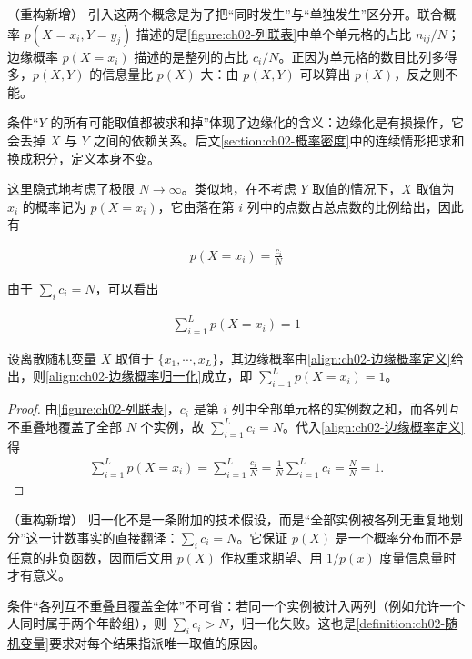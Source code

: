 \documentclass[../../main.tex]{subfiles}
\begin{document}
\begin{remark}（重构新增）
引入这两个概念是为了把“同时发生”与“单独发生”区分开。联合概率 $p(X=x_i,Y=y_j)$ 描述的是\cref{figure:ch02-列联表}中单个单元格的占比 $n_{ij}/N$；边缘概率 $p(X=x_i)$ 描述的是整列的占比 $c_i/N$。正因为单元格的数目比列多得多，$p(X,Y)$ 的信息量比 $p(X)$ 大：由 $p(X,Y)$ 可以算出 $p(X)$，反之则不能。

条件“$Y$ 的所有可能取值都被求和掉”体现了边缘化的含义：边缘化是有损操作，它会丢掉 $X$ 与 $Y$ 之间的依赖关系。后文\cref{section:ch02-概率密度}中的连续情形把求和换成积分，定义本身不变。
\end{remark}

这里隐式地考虑了极限 $N\to\infty$。类似地，在不考虑 $Y$ 取值的情况下，$X$ 取值为 $x_i$ 的概率记为 $p(X=x_i)$，它由落在第 $i$ 列中的点数占总点数的比例给出，因此有

\begin{align}
  p(X=x_i) = \frac{c_i}{N}
  \label{align:ch02-边缘概率定义}
\end{align}

由于 $\sum_i c_i = N$，可以看出

\begin{align}
  \sum_{i=1}^{L} p(X=x_i) = 1
  \label{align:ch02-边缘概率归一化}
\end{align}

\begin{proposition}[边缘概率的归一化]\label{proposition:ch02-边缘概率归一化}
设离散随机变量 $X$ 取值于 $\{x_1,\cdots,x_L\}$，其边缘概率由\eqref{align:ch02-边缘概率定义}给出，则\eqref{align:ch02-边缘概率归一化}成立，即 $\sum_{i=1}^{L}p(X=x_i)=1$。
\end{proposition}

\begin{proof}
由\cref{figure:ch02-列联表}，$c_i$ 是第 $i$ 列中全部单元格的实例数之和，而各列互不重叠地覆盖了全部 $N$ 个实例，故 $\sum_{i=1}^{L}c_i=N$。代入\eqref{align:ch02-边缘概率定义}得
\begin{align*}
  \sum_{i=1}^{L} p(X=x_i) = \sum_{i=1}^{L}\frac{c_i}{N} = \frac{1}{N}\sum_{i=1}^{L}c_i = \frac{N}{N} = 1 .
\end{align*}
\end{proof}

\begin{remark}（重构新增）
归一化不是一条附加的技术假设，而是“全部实例被各列无重复地划分”这一计数事实的直接翻译：$\sum_i c_i=N$。它保证 $p(X)$ 是一个概率分布而不是任意的非负函数，因而后文用 $p(X)$ 作权重求期望、用 $1/p(x)$ 度量信息量时才有意义。

条件“各列互不重叠且覆盖全体”不可省：若同一个实例被计入两列（例如允许一个人同时属于两个年龄组），则 $\sum_i c_i>N$，归一化失败。这也是\cref{definition:ch02-随机变量}要求对每个结果指派唯一取值的原因。
\end{remark}
\end{document}
